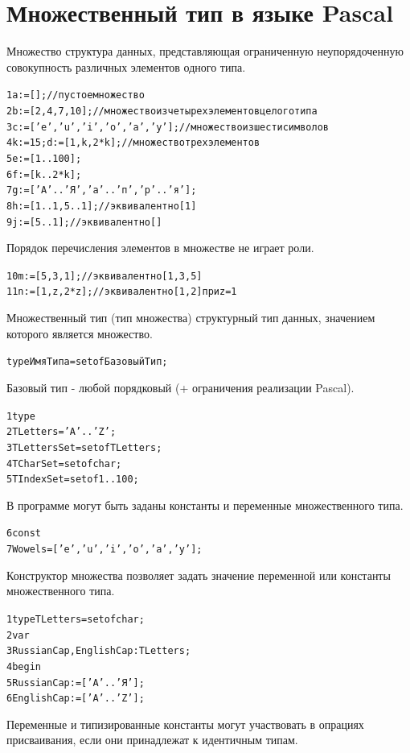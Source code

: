 \documentclass{beamer}
\begin{document}
\section{Множественный тип в языке Pascal}
\begin{frame}[fragile]
\begin{block}{Множество}
структура данных, представляющая ограниченную неупорядоченную совокупность различных элементов одного типа.
\end{block}
\begin{alltt}
1  a := []; //пустое множество
2  b := [2, 4, 7, 10]; //множество из четырех элементов целого типа
3  с := ['e', 'u', 'i', 'o', 'a', 'y']; //множество из шести символов
4  k := 15; d := [1, k, 2*k]; //множество трех элементов
5  e := [1..100];
6  f := [k..2*k];
7  g := ['А'..'Я', 'а'..'п', 'р'..'я'];
8  h := [1..1, 5..1]; //эквивалентно [1]
9  j := [5..1];//эквивалентно []
\end{alltt}
Порядок перечисления элементов в множестве не играет роли.
\begin{alltt}
10  m := [5, 3, 1]; //эквивалентно [1, 3, 5]
11  n := [1, z, 2*z]; //эквивалентно [1, 2] при z = 1
\end{alltt}
\end{frame}

\begin{frame}[fragile]
\begin{block}{Множественный тип (тип множества)}
структурный тип данных, значением которого является множество.
\end{block}
\begin{alltt}
  type ИмяТипа = set of БазовыйТип;
\end{alltt}
Базовый тип - любой порядковый (+ ограничения реализации Pascal).
\begin{alltt}
1  type 
2     TLetters = 'A'..'Z';
3     TLettersSet = set of TLetters;
4     TCharSet = set of char;  
5     TIndexSet = set of 1..100;
\end{alltt}
В программе могут быть заданы константы и переменные множественного типа.
\begin{alltt}
6  const 
7     Wowels = ['e', 'u', 'i', 'o', 'a', 'y'];
\end{alltt}
\end{frame}
   
\begin{frame}[fragile]
\begin{block}{Конструктор множества}
позволяет задать значение переменной или константы множественного типа.
\end{block}
\begin{alltt}
1  type TLetters = set of char;
2  var
3     RussianCap, EnglishCap: TLetters;
4  begin
5     RussianCap := ['А'..'Я'];
6     EnglishCap := ['A'..'Z'];
\end{alltt}
Переменные и типизированные константы могут участвовать в опрациях присваивания, если они 
принадлежат к идентичным типам.
\end{frame}  
\end{document}
